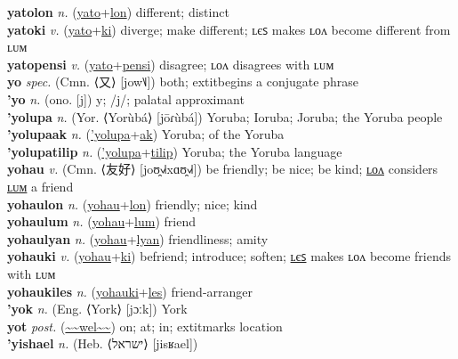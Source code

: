 \textbf{yatolon} \textit{n.} (\hyperref[yato]{yato}+\hyperref[lon]{lon})
different; distinct \label{yatolon} \\
\textbf{yatoki} \textit{v.} (\hyperref[yato]{yato}+\hyperref[ki]{ki})
diverge; make different; ʟєꜱ makes ʟᴏᴧ become different from ʟᴜᴍ \label{yatoki} \\
\textbf{yatopensi} \textit{v.} (\hyperref[yato]{yato}+\hyperref[pensi]{pensi})
disagree; ʟᴏᴧ disagrees with ʟᴜᴍ \label{yatopensi} \\
\textbf{yo} \textit{spec.} (Cmn. ⟨又⟩ [jow˥˩])
both; 	extit{begins a conjugate phrase} \label{yo} \\
\textbf{'yo} \textit{n.} (ono. [j])
y; /j/; palatal approximant \label{'yo} \\
\textbf{'yolupa} \textit{n.} (Yor. ⟨Yorùbá⟩ [jōɾùbá])
Yoruba; Ioruba; Joruba; the Yoruba people \label{'yolupa} \\
\textbf{'yolupaak} \textit{n.} (\hyperref['yolupa]{'yolupa}+\hyperref[ak]{ak})
Yoruba; of the Yoruba \label{'yolupaak} \\
\textbf{'yolupatilip} \textit{n.} (\hyperref['yolupa]{'yolupa}+\hyperref[tilip]{tilip})
Yoruba; the Yoruba language \label{'yolupatilip} \\
\textbf{yohau} \textit{v.} (Cmn. ⟨友好⟩ [joʊ̯˧˩˧xɑʊ̯˧˩˧])
be friendly; be nice; be kind; \hyperref[yohaulon]{ʟᴏᴧ} considers \hyperref[yohaulum]{ʟᴜᴍ} a friend \label{yohau} \\
\textbf{yohaulon} \textit{n.} (\hyperref[yohau]{yohau}+\hyperref[lon]{lon})
friendly; nice; kind \label{yohaulon} \\
\textbf{yohaulum} \textit{n.} (\hyperref[yohau]{yohau}+\hyperref[lum]{lum})
friend \label{yohaulum} \\
\textbf{yohaulyan} \textit{n.} (\hyperref[yohau]{yohau}+\hyperref[lyan]{lyan})
friendliness; amity \label{yohaulyan} \\
\textbf{yohauki} \textit{v.} (\hyperref[yohau]{yohau}+\hyperref[ki]{ki})
befriend; introduce; soften; \hyperref[yohaukiles]{ʟєꜱ} makes ʟᴏᴧ become friends with ʟᴜᴍ \label{yohauki} \\
\textbf{yohaukiles} \textit{n.} (\hyperref[yohauki]{yohauki}+\hyperref[les]{les})
friend-arranger \label{yohaukiles} \\
\textbf{'yok} \textit{n.} (Eng. ⟨York⟩ [jɔːk])
York \label{'yok} \\
\textbf{yot} \textit{post.} (\hyperref[wel]{\~{}\~{}wel\~{}\~{}})
on; at; in; 	extit{marks location} \label{yot} \\
\textbf{'yishael} \textit{n.} (Heb. ⟨ישראל⟩ [jisʁael])
